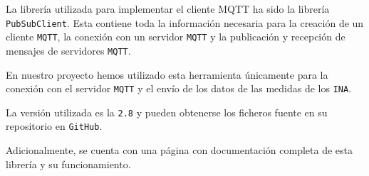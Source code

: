 La librería utilizada para implementar el cliente MQTT ha sido la librería \texttt{PubSubClient}.  Esta contiene toda la información necesaria para la creación de un cliente \texttt{MQTT}, la conexión con un servidor \texttt{MQTT} y la publicación y recepción de mensajes de servidores \texttt{MQTT}.

En nuestro proyecto hemos utilizado esta herramienta únicamente para la conexión con el servidor \texttt{MQTT} y el envío de los datos de las medidas de los \texttt{INA}.

La versión utilizada es la \texttt{2.8} y pueden obtenerse los ficheros fuente en su repositorio en \texttt{GitHub}. \cite{olearyKnollearyPubsubclient2024}

Adicionalmente, se cuenta con una página con documentación completa de esta librería y su funcionamiento. \cite{nickolearyArduinoClientMQTT}